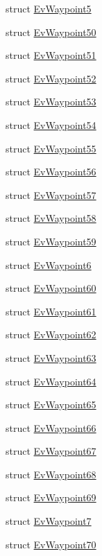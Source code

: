 \begin{DoxyCompactItemize}
\item 
struct \hyperlink{structsmacc_1_1EvWaypoint5}{Ev\+Waypoint5}
\item 
struct \hyperlink{structsmacc_1_1EvWaypoint50}{Ev\+Waypoint50}
\item 
struct \hyperlink{structsmacc_1_1EvWaypoint51}{Ev\+Waypoint51}
\item 
struct \hyperlink{structsmacc_1_1EvWaypoint52}{Ev\+Waypoint52}
\item 
struct \hyperlink{structsmacc_1_1EvWaypoint53}{Ev\+Waypoint53}
\item 
struct \hyperlink{structsmacc_1_1EvWaypoint54}{Ev\+Waypoint54}
\item 
struct \hyperlink{structsmacc_1_1EvWaypoint55}{Ev\+Waypoint55}
\item 
struct \hyperlink{structsmacc_1_1EvWaypoint56}{Ev\+Waypoint56}
\item 
struct \hyperlink{structsmacc_1_1EvWaypoint57}{Ev\+Waypoint57}
\item 
struct \hyperlink{structsmacc_1_1EvWaypoint58}{Ev\+Waypoint58}
\item 
struct \hyperlink{structsmacc_1_1EvWaypoint59}{Ev\+Waypoint59}
\item 
struct \hyperlink{structsmacc_1_1EvWaypoint6}{Ev\+Waypoint6}
\item 
struct \hyperlink{structsmacc_1_1EvWaypoint60}{Ev\+Waypoint60}
\item 
struct \hyperlink{structsmacc_1_1EvWaypoint61}{Ev\+Waypoint61}
\item 
struct \hyperlink{structsmacc_1_1EvWaypoint62}{Ev\+Waypoint62}
\item 
struct \hyperlink{structsmacc_1_1EvWaypoint63}{Ev\+Waypoint63}
\item 
struct \hyperlink{structsmacc_1_1EvWaypoint64}{Ev\+Waypoint64}
\item 
struct \hyperlink{structsmacc_1_1EvWaypoint65}{Ev\+Waypoint65}
\item 
struct \hyperlink{structsmacc_1_1EvWaypoint66}{Ev\+Waypoint66}
\item 
struct \hyperlink{structsmacc_1_1EvWaypoint67}{Ev\+Waypoint67}
\item 
struct \hyperlink{structsmacc_1_1EvWaypoint68}{Ev\+Waypoint68}
\item 
struct \hyperlink{structsmacc_1_1EvWaypoint69}{Ev\+Waypoint69}
\item 
struct \hyperlink{structsmacc_1_1EvWaypoint7}{Ev\+Waypoint7}
\item 
struct \hyperlink{structsmacc_1_1EvWaypoint70}{Ev\+Waypoint70}

\end{DoxyCompactItemize}
